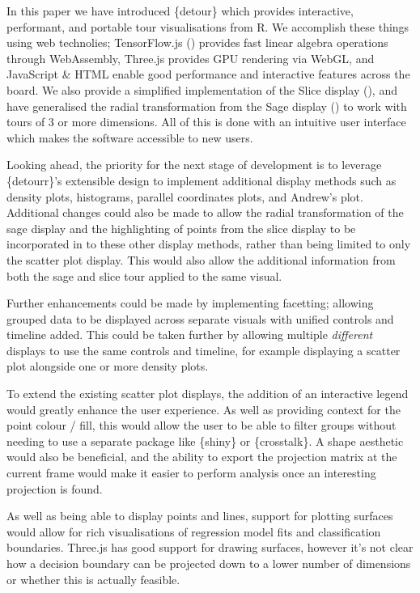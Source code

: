 In this paper we have introduced \{detour\} which provides interactive,
performant, and portable tour visualisations from R. We accomplish these
things using web technolies; TensorFlow.js (\citet{abadi2016tensorflow})
provides fast linear algebra operations through WebAssembly, Three.js
provides GPU rendering via WebGL, and JavaScript \& HTML enable good
performance and interactive features across the board. We also provide a
simplified implementation of the Slice display (\citet{laa2020slice}),
and have generalised the radial transformation from the Sage display
(\citet{laa2021burning}) to work with tours of 3 or more dimensions. All
of this is done with an intuitive user interface which makes the
software accessible to new users.

Looking ahead, the priority for the next stage of development is to
leverage \{detourr\}'s extensible design to implement additional display
methods such as density plots, histograms, parallel coordinates plots,
and Andrew's plot. Additional changes could also be made to allow the
radial transformation of the sage display and the highlighting of points
from the slice display to be incorporated in to these other display
methods, rather than being limited to only the scatter plot display.
This would also allow the additional information from both the sage and
slice tour applied to the same visual.

Further enhancements could be made by implementing facetting; allowing
grouped data to be displayed across separate visuals with unified
controls and timeline added. This could be taken further by allowing
multiple \emph{different} displays to use the same controls and
timeline, for example displaying a scatter plot alongside one or more
density plots.

To extend the existing scatter plot displays, the addition of an
interactive legend would greatly enhance the user experience. As well as
providing context for the point colour / fill, this would allow the user
to be able to filter groups without needing to use a separate package
like \{shiny\} or \{crosstalk\}. A shape aesthetic would also be
beneficial, and the ability to export the projection matrix at the
current frame would make it easier to perform analysis once an
interesting projection is found.

As well as being able to display points and lines, support for plotting
surfaces would allow for rich visualisations of regression model fits
and classification boundaries. Three.js has good support for drawing
surfaces, however it's not clear how a decision boundary can be
projected down to a lower number of dimensions or whether this is
actually feasible.

